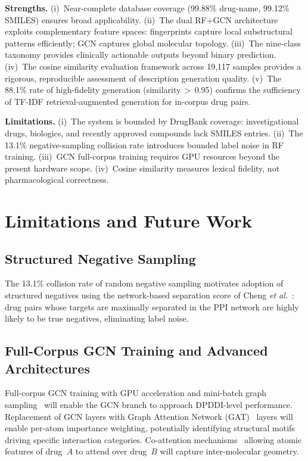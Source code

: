 \documentclass[conference]{IEEEtran}
\begin{document}
\textbf{Strengths.}
(i)~Near-complete database coverage (99.88\% drug-name, 99.12\% SMILES) ensures broad
applicability.
(ii)~The dual RF+GCN architecture exploits complementary feature spaces: fingerprints
capture local substructural patterns efficiently; GCN captures global molecular topology.
(iii)~The nine-class taxonomy provides clinically actionable outputs beyond binary prediction.
(iv)~The cosine similarity evaluation framework across 19,117 samples provides a rigorous,
reproducible assessment of description generation quality.
(v)~The 88.1\% rate of high-fidelity generation (similarity\,$>$\,0.95) confirms the
sufficiency of TF-IDF retrieval-augmented generation for in-corpus drug pairs.

\textbf{Limitations.}
(i)~The system is bounded by DrugBank coverage: investigational drugs, biologics, and
recently approved compounds lack SMILES entries.
(ii)~The 13.1\% negative-sampling collision rate introduces bounded label noise in RF
training.
(iii)~GCN full-corpus training requires GPU resources beyond the present hardware scope.
(iv)~Cosine similarity measures lexical fidelity, not pharmacological correctness.

\section{Limitations and Future Work}
\label{sec:limitations}

\subsection{Structured Negative Sampling}

The 13.1\% collision rate of random negative sampling motivates adoption of structured
negatives using the network-based separation score of Cheng \textit{et
al.}~\cite{cheng2012network}: drug pairs whose targets are maximally separated in the PPI
network are highly likely to be true negatives, eliminating label noise.

\subsection{Full-Corpus GCN Training and Advanced Architectures}

Full-corpus GCN training with GPU acceleration and mini-batch graph
sampling~\cite{gilmer2017mpnn} will enable the GCN branch to approach DPDDI-level
performance. Replacement of GCN layers with Graph Attention Network
(GAT)~\cite{velickovic2018gat} layers will enable per-atom importance weighting,
potentially identifying structural motifs driving specific interaction categories. Co-attention
mechanisms~\cite{deac2019drug} allowing atomic features of drug~$A$ to attend over drug~$B$
will capture inter-molecular geometry.
\end{document}
